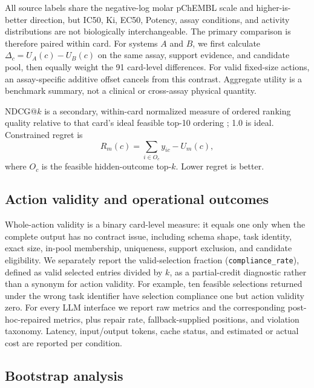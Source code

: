 \documentclass[10pt,a4paper]{article}
\begin{document}
All source labels share the negative-log molar pChEMBL scale and
higher-is-better direction, but IC50, Ki, EC50, Potency, assay conditions, and
activity distributions are not biologically interchangeable. The primary
comparison is therefore paired within card. For systems $A$ and $B$, we first
calculate $\Delta_c=U_A(c)-U_B(c)$ on the same assay, support evidence, and
candidate pool, then equally weight the 91 card-level differences. For valid
fixed-size actions, an assay-specific additive offset cancels from this
contrast. Aggregate utility is a benchmark summary, not a clinical or
cross-assay physical quantity.

NDCG@$k$ is a secondary, within-card normalized measure of ordered ranking
quality relative to that card's ideal feasible top-10 ordering
\cite{jarvelin2002dcg}; 1.0 is ideal. Constrained regret is
\begin{equation}
R_m(c)=\sum_{i\in O_c}y_{ic}-U_m(c),
\end{equation}
where $O_c$ is the feasible hidden-outcome top-$k$. Lower regret is better.

\subsection{Action validity and operational outcomes}

Whole-action validity is a binary card-level measure: it equals one only when
the complete output has no contract issue, including schema shape, task
identity, exact size, in-pool membership, uniqueness, support exclusion, and
candidate eligibility. We separately report the valid-selection fraction
(\texttt{compliance\_rate}), defined as valid selected entries divided by $k$,
as a partial-credit diagnostic rather than a synonym for action validity. For
example, ten feasible selections returned under the wrong task identifier have
selection compliance one but action validity zero. For every LLM interface we
report raw metrics and the corresponding post-hoc-repaired metrics, plus repair
rate, fallback-supplied positions, and violation taxonomy. Latency, input/output
tokens, cache status, and estimated or actual cost are reported per condition.

\subsection{Bootstrap analysis}
\end{document}
